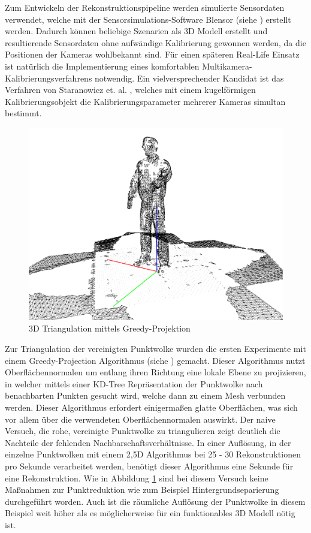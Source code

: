 Zum Entwickeln der Rekonstruktionspipeline werden simulierte Sensordaten 
verwendet, welche mit der Sensorsimulations-Software Blensor 
(siehe \cite{Gschwandtner11b}) erstellt werden. Dadurch können beliebige 
Szenarien als 3D Modell erstellt und resultierende Sensordaten ohne aufwändige 
Kalibrierung gewonnen werden, da die Positionen der Kameras wohlbekannt sind. 
Für einen späteren Real-Life Einsatz ist natürlich die Implementierung eines 
komfortablen Multikamera-Kalibrierungsverfahrens notwendig. Ein 
vielversprechender Kandidat ist das Verfahren von Staranowicz et. al. 
\cite{staranowicz2014easy}, welches mit einem kugelförmigen Kalibrierungsobjekt 
die Kalibrierungsparameter mehrerer Kameras simultan bestimmt.

\begin{figure}[H]
	\centering
	\includegraphics[width=.5\textwidth]{figs/meshed}
	\caption{3D Triangulation mittels Greedy-Projektion}
	\label{fig:meshed}
\end{figure}


Zur Triangulation der vereinigten Punktwolke wurden die ersten Experimente mit 
einem Greedy-Projection Algorithmus (siehe \cite{Marton09ICRA}) gemacht. Dieser 
Algorithmus nutzt Oberflächennormalen um entlang ihren Richtung eine lokale 
Ebene zu projizieren, in welcher mittels einer KD-Tree Repräsentation der Punktwolke 
nach benachbarten Punkten gesucht wird, welche dann zu einem Mesh verbunden 
werden. Dieser Algorithmus erfordert einigermaßen glatte Oberflächen, was sich 
vor allem über die verwendeten Oberflächennormalen auswirkt. Der naive Versuch, die 
rohe, vereinigte Punktwolke zu triangulieren zeigt deutlich die Nachteile der 
fehlenden Nachbarschaftsverhältnisse. In einer Auflösung, in der einzelne 
Punktwolken mit einem 2,5D Algorithmus bei 25 - 30 Rekonstruktionen pro Sekunde 
verarbeitet werden, benötigt dieser Algorithmus eine Sekunde für eine 
Rekonstruktion. Wie in Abbildung \ref{fig:meshed} sind bei diesem Versuch keine 
Maßnahmen zur Punktreduktion wie zum Beispiel Hintergrundseparierung 
durchgeführt worden. Auch ist die räumliche Auflösung der Punktwolke in diesem 
Beispiel weit höher als es möglicherweise für ein funktionables 3D Modell nötig 
ist.


